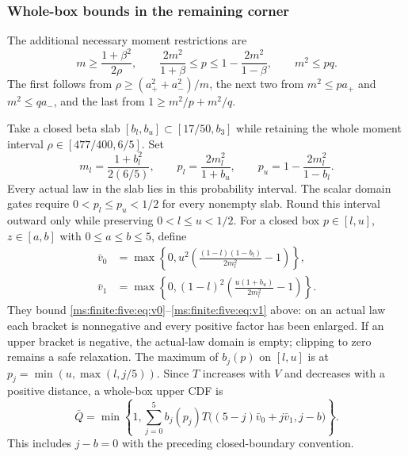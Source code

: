 \subsubsection{Whole-box bounds in the remaining corner}

The additional necessary moment restrictions are
\begin{equation}\label{ms:finite:five:eq:moments}
 m\ge\frac{1+\beta^2}{2\rho},\qquad
 \frac{2m^2}{1+\beta}\le p\le1-\frac{2m^2}{1-\beta},\qquad
 m^2\le pq.
\end{equation}
The first follows from $\rho\ge(a_+^2+a_-^2)/m$, the next two
from $m^2\le p a_+$ and $m^2\le q a_-$, and the last from
$1\ge m^2/p+m^2/q$.

Take a closed beta slab $[b_l,b_u]\subset[17/50,b_3]$ while retaining
the whole moment interval $\rho\in[477/400,6/5]$. Set
\[
 m_l=\frac{1+b_l^2}{2(6/5)},\qquad
 p_l=\frac{2m_l^2}{1+b_u},\qquad
 p_u=1-\frac{2m_l^2}{1-b_l}.
\]
Every actual law in the slab lies in this probability interval.
The scalar domain gates require $0<p_l\le p_u<1/2$ for every
nonempty slab. Round this interval outward only while preserving
$0<l\le u<1/2$. For a closed box $p\in[l,u]$, $z\in[a,b]$ with
$0\le a\le b\le5$, define
\begin{align*}
 \bar v_0&=\max\left\{0,u^2
             \left(\frac{(1-l)(1-b_l)}{2m_l^2}-1\right)\right\},\\
 \bar v_1&=\max\left\{0,(1-l)^2
             \left(\frac{u(1+b_u)}{2m_l^2}-1\right)\right\}.
\end{align*}
They bound \eqref{ms:finite:five:eq:v0}--\eqref{ms:finite:five:eq:v1} above: on an
actual law each bracket is nonnegative and every positive factor has
been enlarged. If an upper bracket is negative, the actual-law domain
is empty; clipping to zero remains a safe relaxation.
The maximum of $b_j(p)$ on $[l,u]$ is at
$p_j=\min(u,\max(l,j/5))$. Since $T$ increases with $V$ and
decreases with a positive distance, a whole-box upper CDF is
\[
 \bar Q=\min\left\{1,\sum_{j=0}^5b_j(p_j)
 T\bigl((5-j)\bar v_0+j\bar v_1,j-b\bigr)\right\}.
\]
This includes $j-b=0$ with the preceding closed-boundary convention.

